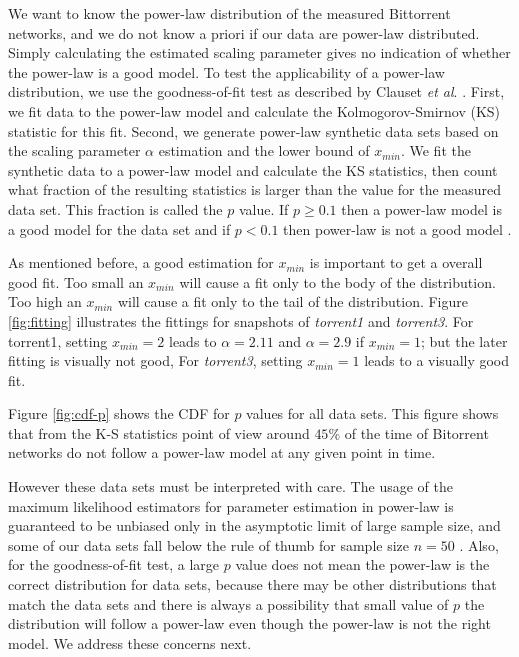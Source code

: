 \documentclass[10pt,conference,letterpaper,final]{IEEEtran}
\begin{document}
We want to know the power-law distribution of the measured Bittorrent networks, and we do not know a priori if our data are power-law distributed.
Simply calculating the estimated scaling parameter gives no indication of whether the power-law is a good model.  
To test the applicability of a power-law distribution, we use the goodness-of-fit test as described by Clauset \textit{et al}. \cite{clauset2009power}. 
First, we fit data to the power-law model and calculate the Kolmogorov-Smirnov (KS) statistic for this fit. 
Second, we generate power-law synthetic data sets based on the scaling parameter $\alpha$ estimation and the lower bound of $x_{min}$. 
We fit the synthetic data to a power-law model and calculate the KS statistics, then count what fraction of the resulting statistics is larger than the value for the measured data set. 
This fraction is called the $p$ value.  
If $p \geq 0.1$ then a power-law model is a good model for the data set and if $p < 0.1$ then power-law is not a good model \cite{clauset2009power}.

As mentioned before, a good estimation for $x_{min}$ is important to get a overall good fit.
Too small an $x_{min}$ will cause a fit only to the body of the distribution.
Too high an $x_{min}$ will cause a fit only to the tail of the distribution.
Figure  \ref{fig:fitting} illustrates the fittings for snapshots of \emph{torrent1} and \emph{torrent3}.
For torrent1, setting $x_{min}=2$  leads to  $\alpha=2.11$ and $\alpha=2.9$ if  $x_{min}=1$; but the later fitting is visually not good, For  \emph{torrent3}, setting $x_{min}=1$ leads to a visually good fit.

Figure  \ref{fig:cdf-p} shows the CDF for $p$ values for all data sets. 
This figure shows that from the K-S statistics point of view around $45\%$ of the time of Bitorrent networks do not follow a power-law model at any given point in time.

However these data sets must be interpreted with care. 
The usage of the maximum likelihood estimators for parameter estimation in power-law is guaranteed to be unbiased only in the asymptotic limit of large sample size, and some of our data sets fall below the rule of thumb for sample size $n=50$ \cite{clauset2009power}. 
Also, for the goodness-of-fit test, a large $p$ value does not mean the power-law  is the correct distribution for data sets, because there may be other distributions that match the data sets and there is always a possibility that small value of $p$ the distribution will follow a power-law even though the power-law is not the right model\cite{clauset2009power}. 
We address these concerns next.
\end{document}
